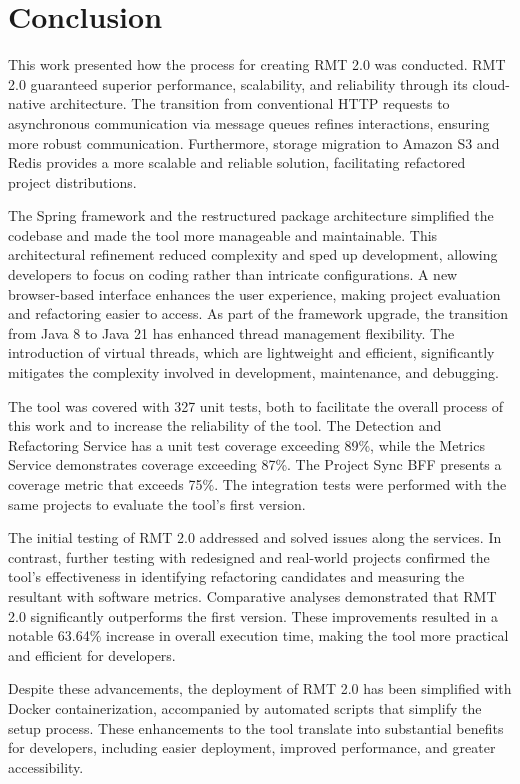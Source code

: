 \chapter{Conclusion}%
\label{conclusion}

This work presented how the process for creating RMT 2.0 was conducted. RMT 2.0 guaranteed superior performance, scalability, and reliability through its  cloud-native architecture. The transition from conventional HTTP requests to asynchronous communication via message queues refines interactions, ensuring more robust communication. Furthermore, storage migration to Amazon S3 and Redis provides a more scalable and reliable solution, facilitating refactored project distributions.

The Spring framework and the restructured package architecture simplified the codebase and made the tool more manageable and maintainable. This architectural refinement reduced complexity and sped up development, allowing developers to focus on coding rather than intricate configurations. A new browser-based interface enhances the user experience, making project evaluation and refactoring easier to access. As part of the framework upgrade, the transition from Java 8 to Java 21 has enhanced thread management flexibility. The introduction of virtual threads, which are lightweight and efficient, significantly mitigates the complexity involved in development, maintenance, and debugging.

The tool was covered with 327 unit tests, both to facilitate the overall process of this work and to increase the reliability of the tool. The Detection and Refactoring Service has a unit test coverage exceeding 89\%, while the Metrics Service demonstrates coverage exceeding 87\%. The Project Sync BFF presents a coverage metric that exceeds 75\%. The integration tests were performed with the same projects to evaluate the tool's first version.

The initial testing of RMT 2.0 addressed and solved issues along the services. In contrast, further testing with redesigned and real-world projects confirmed the tool's effectiveness in identifying refactoring candidates and measuring the resultant with software metrics. Comparative analyses demonstrated that RMT 2.0 significantly outperforms the first version. These improvements resulted in a notable 63.64\% increase in overall execution time, making the tool more practical and efficient for developers.

Despite these advancements, the deployment of RMT 2.0 has been simplified with Docker containerization, accompanied by automated scripts that simplify the setup process. These enhancements to the tool translate into substantial benefits for developers, including easier deployment, improved performance, and greater accessibility.


